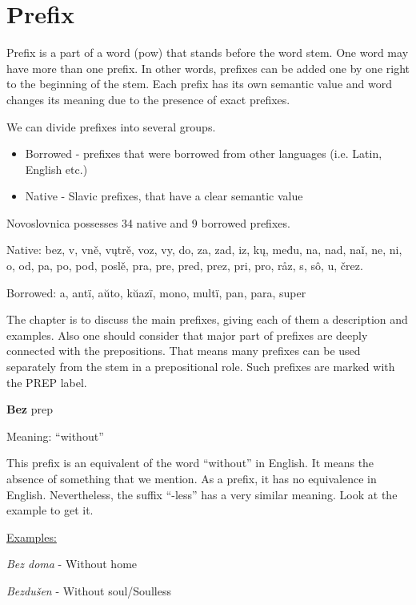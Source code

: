 \section{Prefix}


Prefix is a part of a word (\gls{pow}) that stands before the word stem. One word may have more than one prefix. In other words, prefixes can be added one by one right to the beginning of the stem. Each prefix has its own semantic value and word changes its meaning due to the presence of exact prefixes.

We can divide prefixes into several groups. 

\begin{itemize}
	\item Borrowed - prefixes that were borrowed from other languages (i.e. Latin, English etc.)
	\item Native - Slavic prefixes, that have a clear semantic value
\end{itemize}

Novoslovnica possesses 34 native and 9 borrowed prefixes.

Native: bez, v, vně, vųtrě, voz, vy, do, za, zad, iz, kų, među, na, nad, naǐ, ne, ni, o, od, pa, po, pod, poslě, pra, pre, pred, prez, pri, pro, råz, s, sô, u, črez.

Borrowed: a, antï, aŭto, kŭazï, mono, multï, pan, para, super

The chapter is to discuss the main prefixes, giving each of them a description and examples. Also one should consider that major part of prefixes are deeply connected with the prepositions. That means many prefixes can be used separately from the stem in a prepositional role. Such prefixes are marked with the PREP label. 

\textbf{Bez} \gls{prep}

Meaning: “without”

This prefix is an equivalent of the word “without” in English. It means the absence of something that we mention. As a prefix, it has no equivalence in English. Nevertheless, the suffix “-less” has a very similar meaning. Look at the example to get it.

\underline{Examples:}

\textit{Bez doma} - Without home

\textit{Bezdušen} - Without soul/Soulless 


